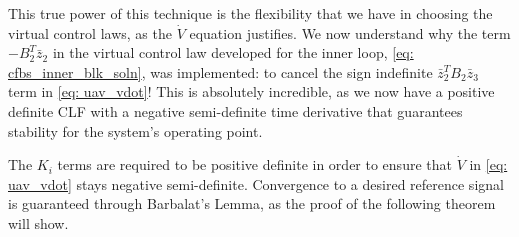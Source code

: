 \documentclass[12pt]{ucthesis}
\begin{document}
This true power of this technique is the flexibility that we have in choosing the virtual control laws, as the $\dot{V}$ equation justifies. We now understand why the term $-B^T_2\bar{z}_2$ in the virtual control law developed for the inner loop, \autoref{eq: cfbs_inner_blk_soln}, was implemented: to cancel the sign indefinite $\bar{z}^T_2 B_2 \bar{z}_3$ term in \autoref{eq: uav_vdot}! This is absolutely incredible, as we now have a positive definite CLF with a negative semi-definite time derivative that guarantees stability for the system's operating point.

The $K_i$ terms are required to be positive definite in order to ensure that $\dot{V}$ in \autoref{eq: uav_vdot} stays negative semi-definite. Convergence to a desired reference signal is guaranteed through Barbalat's Lemma, as the proof of the following theorem will show.
\end{document}
